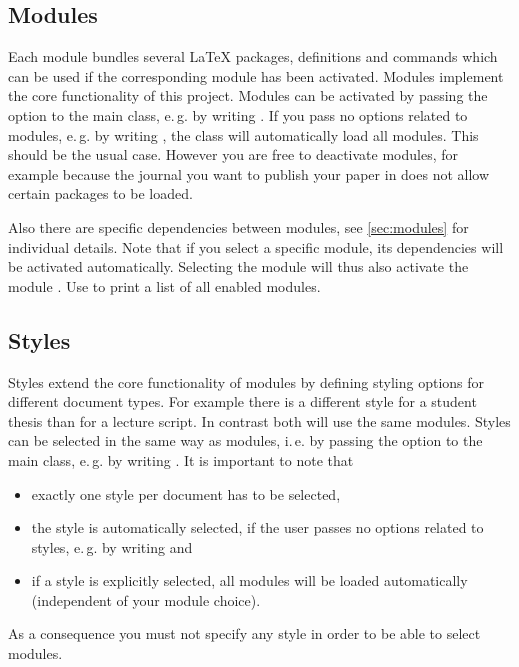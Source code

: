 \subsection{Modules}%
\label{sec:frontmatter_modules}%
Each module bundles several LaTeX packages, definitions and commands which can be used if the corresponding module has been activated. Modules implement the core functionality of this project. Modules can be activated by passing the option  to the main class, e.\,g. by writing . If you pass no options related to modules, e.\,g. by writing , the class will automatically load all modules. This should be the usual case. However you are free to deactivate modules, for example because the journal you want to publish your paper in does not allow certain packages to be loaded.\par%
%
Also there are specific dependencies between modules, see \cref{sec:modules} for individual details. Note that if you select a specific module, its dependencies will be activated automatically. Selecting the module  will thus also activate the module . Use  to print a list of all enabled modules.\par%
%
\subsection{Styles}%
\label{sec:frontmatter_styles}%
Styles extend the core functionality of modules by defining styling options for different document types. For example there is a different style for a student thesis than for a lecture script. In contrast both will use the same modules. Styles can be selected in the same way as modules, i.\,e. by passing the option  to the main class, e.\,g. by writing . It is important to note that
%
\begin{itemize}%
    \item exactly one style per document has to be selected,%
    \item the style  is automatically selected, if the user passes no options related to styles, e.\,g. by writing   and%
    \item if a style is explicitly selected, all modules will be loaded automatically (independent of your module choice).%
\end{itemize}%
%
As a consequence you must not specify any style in order to be able to select modules.\par%
%
%
